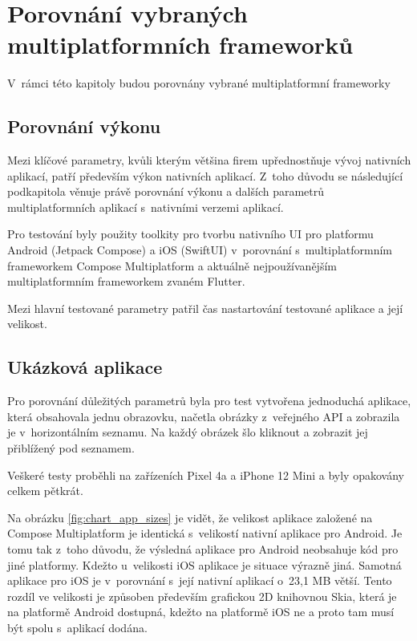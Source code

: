 \section{Porovnání vybraných multiplatformních frameworků}

V~rámci této kapitoly budou porovnány vybrané multiplatformní frameworky


\subsection{Porovnání výkonu}

Mezi klíčové parametry, kvůli kterým většina firem upřednostňuje vývoj nativních aplikací, patří především výkon
nativních aplikací. Z~toho důvodu se následující podkapitola věnuje právě porovnání výkonu a dalších parametrů multiplatformních aplikací
s~nativními verzemi aplikací. 

Pro testování byly použity toolkity pro tvorbu nativního UI pro platformu Android (Jetpack Compose) a iOS (SwiftUI)
v~porovnání s~multiplatformním frameworkem Compose Multiplatform a aktuálně nejpoužívanějším multiplatformním
frameworkem zvaném Flutter. \cite{crossPlatformFrameworksStats} 

Mezi hlavní testované parametry patřil čas nastartování testované aplikace a její velikost.

\subsection*{Ukázková aplikace}
Pro porovnání důležitých parametrů byla pro test vytvořena jednoduchá aplikace, která obsahovala jednu obrazovku, 
načetla obrázky z~veřejného API a zobrazila je v~horizontálním seznamu. 
Na každý obrázek šlo kliknout a zobrazit jej přiblížený pod seznamem. 

Veškeré testy proběhli na zařízeních Pixel 4a a iPhone 12 Mini a byly opakovány celkem pětkrát.





Na obrázku \ref{fig:chart_app_sizes} je vidět, že velikost aplikace založené na Compose Multiplatform je identická
s~velikostí nativní aplikace pro Android. Je tomu tak z~toho důvodu, že výsledná aplikace pro Android neobsahuje kód 
pro jiné platformy. \cite{} Kdežto u~velikosti iOS aplikace je situace výrazně jiná. Samotná aplikace pro iOS je v~porovnání
s~její nativní aplikací o~23,1 MB větší. Tento rozdíl ve velikosti je způsoben především grafickou 2D knihovnou Skia,
která je na platformě Android dostupná, kdežto na platformě iOS ne a proto tam musí být spolu s~aplikací dodána. \cite{}


